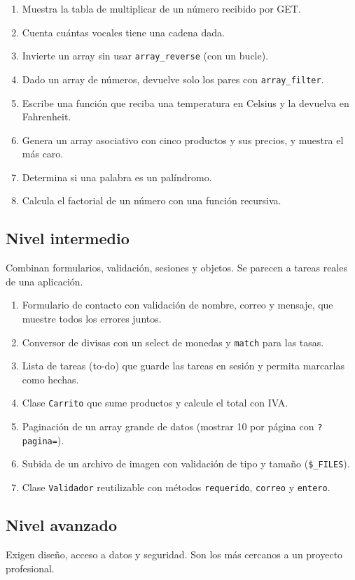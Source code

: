 \documentclass[11pt]{article}
\begin{document}
\begin{enumerate}[leftmargin=1.7em,itemsep=3pt,topsep=2pt]
\item Muestra la tabla de multiplicar de un número recibido por GET.
\item Cuenta cuántas vocales tiene una cadena dada.
\item Invierte un array sin usar \texttt{array\_reverse} (con un bucle).
\item Dado un array de números, devuelve solo los pares con \texttt{array\_filter}.
\item Escribe una función que reciba una temperatura en Celsius y la devuelva en Fahrenheit.
\item Genera un array asociativo con cinco productos y sus precios, y muestra el más caro.
\item Determina si una palabra es un palíndromo.
\item Calcula el factorial de un número con una función recursiva.
\end{enumerate}
\subsection{Nivel intermedio}
Combinan formularios, validación, sesiones y objetos. Se parecen a tareas reales de una aplicación.

\begin{enumerate}[leftmargin=1.7em,itemsep=3pt,topsep=2pt]
\item Formulario de contacto con validación de nombre, correo y mensaje, que muestre todos los errores juntos.
\item Conversor de divisas con un select de monedas y \texttt{match} para las tasas.
\item Lista de tareas (to-do) que guarde las tareas en sesión y permita marcarlas como hechas.
\item Clase \texttt{Carrito} que sume productos y calcule el total con IVA.
\item Paginación de un array grande de datos (mostrar 10 por página con \texttt{?\allowbreak{}pagina=\allowbreak{}}).
\item Subida de un archivo de imagen con validación de tipo y tamaño (\texttt{\$\_FILES}).
\item Clase \texttt{Validador} reutilizable con métodos \texttt{requerido}, \texttt{correo} y \texttt{entero}.
\end{enumerate}
\subsection{Nivel avanzado}
Exigen diseño, acceso a datos y seguridad. Son los más cercanos a un proyecto profesional.
\end{document}

